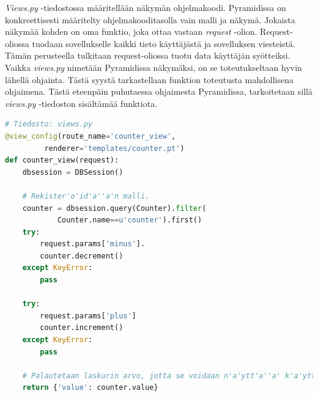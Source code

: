 \documentclass[finnish,utf8,nonumbib,palatino,kandi]{gradu2}
\begin{document}
\emph{Views.py} -tiedostossa määritellään näkymän ohjelmakoodi. Pyramidissa on konkreettisesti määritelty ohjelmakooditasolla vain malli ja näkymä. 
Jokaista näkymää kohden on oma funktio, joka ottaa vastaan \emph{request} -olion. Request-oliossa tuodaan sovellukselle kaikki tieto käyttäjästä ja sovelluksen viesteistä. Tämän perusteella tulkitaan request-oliossa tuotu data käyttäjän syötteiksi.
Vaikka \emph{views.py} nimetään Pyramidissa näkymäksi, on se toteutukseltaan hyvin lähellä ohjainta. Tästä syystä tarkastellaan funktion toteutusta mahdollisena ohjaimena. Tästä eteenpäin puhutaessa ohjaimesta Pyramidissa, tarkoitetaan sillä \emph{views.py} -tiedoston sisältämää funktiota.

\begin{lstlisting}[language=Python]                                          
# Tiedosto: views.py
@view_config(route_name='counter_view',
		 renderer='templates/counter.pt')                                                                    
def counter_view(request):                                                       
    dbsession = DBSession()    

    # Rekister'o'id'a''a'n malli.                                                  
    counter = dbsession.query(Counter).filter(
			Counter.name==u'counter').first()  
    try:                                                                         
        request.params['minus'].                                                 
        counter.decrement()                                                 
    except KeyError:                                                             
        pass                                                                     
                                                                                 
    try:                                                                         
        request.params['plus']                                                   
        counter.increment()                                             
    except KeyError:                                                             
        pass                                                                     

    # Palautetaan laskurin arvo, jotta se voidaan n'a'ytt'a''a' k'a'ytt'a'j'a'lle.                                                  
    return {'value': counter.value}   
\end{lstlisting} 
 
\end{document}
